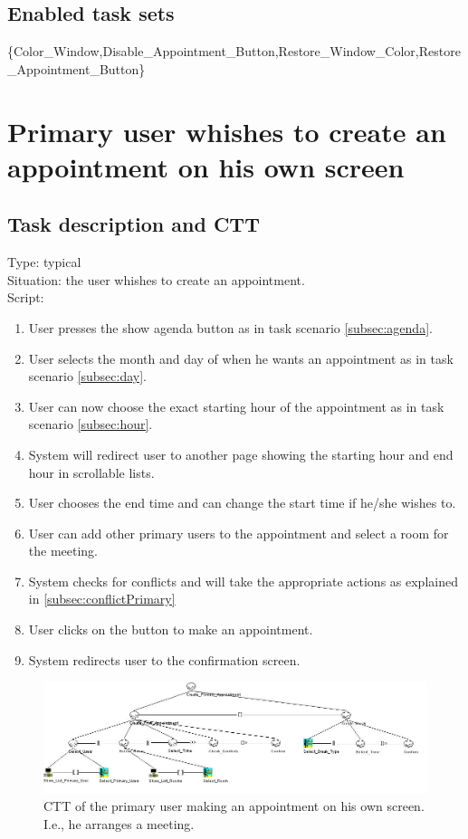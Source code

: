 \documentclass[11pt, a4paper,svglistings]{report}
\begin{document}
\subsection{Enabled task sets}

\{Color\_Window,Disable\_Appointment\_Button,Restore\_Window\_Color,Restore\_Appointment\_Button\}


\newpage

\section{Primary user whishes to create an appointment on his own screen}

\subsection{Task description and CTT}

Type: typical \\
Situation: the user whishes to create an appointment. \\
Script:
\begin{enumerate}
\item User presses the show agenda button as in task scenario \ref{subsec:agenda}.
\item User selects the month and day of when he wants an appointment as in task scenario \ref{subsec:day}.
\item User can now choose the exact starting hour of the appointment as in task scenario \ref{subsec:hour}.
\item System will redirect user to another page showing the starting hour and end hour in scrollable lists.
\item User chooses the end time and can change the start time if he/she wishes to.
\item User can add other primary users to the appointment and select a room for the meeting.
\item System checks for conflicts and will take the appropriate actions as explained in \ref{subsec:conflictPrimary}
\item User clicks on the button to make an appointment.
\item System redirects user to the confirmation screen.
\end{enumerate}

\begin{figure}[H]
\centering
    \includegraphics[width=1\textwidth]{CreatePrimaryAppointment.jpg}
  \caption[Primary user makes his own appointment]{\label{fig:PrimaryUserAppointment}CTT of the primary user making an appointment on his own screen. I.e., he arranges a meeting.}
\end{figure}
\end{document}
